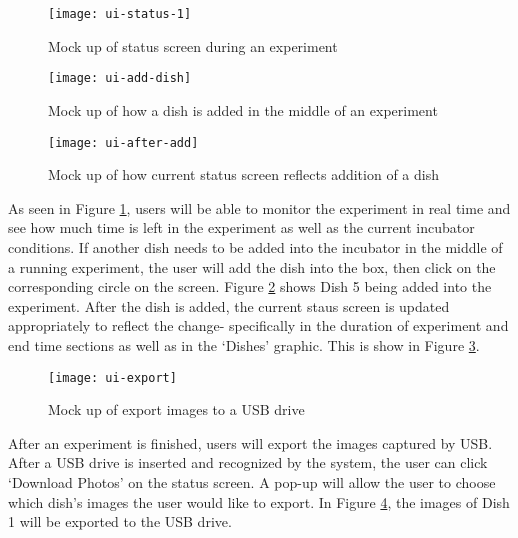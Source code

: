 \begin{figure}[H]
\texttt{[image: ui-status-1]}
\caption{\label{figure:ui-status} Mock up of status screen during an experiment}
\end{figure}

\begin{figure}[H]
\texttt{[image: ui-add-dish]}
\caption{\label{figure:ui-add} Mock up of how a dish is added in the middle of an experiment}
\end{figure}

\begin{figure}[H]
\texttt{[image: ui-after-add]}
\caption{\label{figure:ui-after-add} Mock up of how current status screen reflects addition of a dish}
\end{figure}

As seen in Figure \ref{figure:ui-status}, users will be able to monitor the experiment in real time and see how much time is left in the experiment as well as the current incubator conditions. If another dish needs to be added into the incubator in the middle of a running experiment, the user will add the dish into the box, then click on the corresponding circle on the screen. Figure \ref{figure:ui-add} shows Dish 5 being added into the experiment.  After the dish is added, the current staus screen is updated appropriately to reflect the change- specifically in the duration of experiment and end time sections as well as in the `Dishes' graphic. This is show in Figure \ref{figure:ui-after-add}.


\begin{figure}[H]
\texttt{[image: ui-export]}
\caption{\label{figure:ui-export} Mock up of export images to a USB drive}
\end{figure}

After an experiment is finished, users will export the images captured by USB. After a USB drive is inserted and recognized by the system, the user can click `Download Photos' on the status screen. A pop-up will allow the user to choose which dish's images the user would like to export. In Figure \ref{figure:ui-export}, the images of Dish 1 will be exported to the USB drive.




